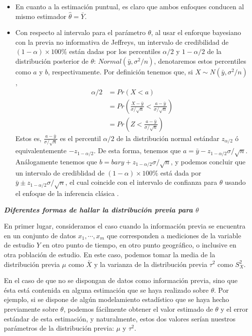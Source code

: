     \begin{itemize}
    \item En cuanto a la estimaci\'on puntual, es claro que ambos enfoques conducen al mismo estimador $\hat{\theta}=\bar{Y}$.
    \item Con respecto al intervalo para el par\'ametro $\theta$, al usar el enforque bayesiano con la previa no informativa de   Jeffreys, un intervalo de credibilidad de $(1-\alpha)\times 100\%$ est\'an dadas por los percentiles $\alpha/2$ y $1-\alpha   /2$ de la distribuci\'on posterior de $\theta$: $Normal(\bar{y},\sigma^2/n)$, denotaremos estos percentiles como $a$ y $b$, respectivamente. 
    Por definici\'on tenemos que, si $X\sim N(\bar{y},\sigma^2/n)$,
    \begin{align*}
    \alpha/2&=Pr(X<a)\\
    &=Pr(\frac{X-\bar{y}}{\sigma/\sqrt{n}}<\frac{a-\bar{y}}{\sigma/\sqrt{n}})\\
    &=Pr(Z < \frac{a-\bar{y}}{\sigma/\sqrt{n}})
    \end{align*}
    Estos es, $\frac{a-\bar{y}}{\sigma/\sqrt{n}}$ es el percentil $\alpha/2$ de la distribuci\'on normal est\'andar $z_{\alpha/2}$ \'o equivalentemente $-z_{1-\alpha/2}$. De esta forma, tenemos que $a=\bar{y}-z_{1-\alpha/2}\sigma/\sqrt{n}$. An\'alogamente tenemos que $b=bar{y}+z_{1-\alpha/2}\sigma/\sqrt{n}$, y podemos concluir que un intervalo de crediblidad de $(1-\alpha)\times 100\%$ est\'a dada por $\bar{y}\pm z_{1-\alpha/2}\sigma/\sqrt{n}$, el cual coincide con el intervalo de confianza para $\theta$ usando el enfoque de la inferencia cl\'asica \cite{Zhang}.
    \end{itemize}
    
    
    \textbf{\emph{Diferentes formas de hallar la distribuci\'on previa para $\theta$}}
    
    En primer lugar, consideramos el caso cuando la informaci\'on previa se encuentra en un conjunto de datos $x_1,\cdots,x_{m}$ que corresponden a mediciones de la variable de estudio $Y$ en otro punto de tiempo, en otro punto geogr\'afico, o inclusive en otra poblaci\'on de estudio. En este caso, podemos tomar la media de la distribuci\'on previa $\mu$ como $\bar{X}$ y la varianza de la distribuci\'on previa $\tau^2$ como $S^2_X$.
    
    En el caso de que no se dispongan de datos como informaci\'on previa, sino que \'esta est\'a contenida en alguna estimaci\'on que se haya realizado sobre $\theta$. Por ejemplo, si se dispone de alg\'un modelamiento estad\'istico que se haya hecho previamente sobre $\theta$, podemos f\'acilmente obtener el valor estimado de $\theta$ y el error est\'andar de esta estimaci\'on, y naturalmente, estos dos valores ser\'ian nuestros par\'ametros de la distribuci\'on previa: $\mu$ y $\tau^2$. 
    
